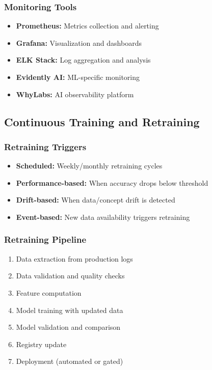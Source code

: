 \documentclass[11pt]{article}
\begin{document}
\subsubsection{Monitoring Tools}
\begin{itemize}
    \item \textbf{Prometheus:} Metrics collection and alerting
    \item \textbf{Grafana:} Visualization and dashboards
    \item \textbf{ELK Stack:} Log aggregation and analysis
    \item \textbf{Evidently AI:} ML-specific monitoring
    \item \textbf{WhyLabs:} AI observability platform
\end{itemize}

\subsection{Continuous Training and Retraining}

\subsubsection{Retraining Triggers}
\begin{itemize}
    \item \textbf{Scheduled:} Weekly/monthly retraining cycles
    \item \textbf{Performance-based:} When accuracy drops below threshold
    \item \textbf{Drift-based:} When data/concept drift is detected
    \item \textbf{Event-based:} New data availability triggers retraining
\end{itemize}

\subsubsection{Retraining Pipeline}
\begin{enumerate}
    \item Data extraction from production logs
    \item Data validation and quality checks
    \item Feature computation
    \item Model training with updated data
    \item Model validation and comparison
    \item Registry update
    \item Deployment (automated or gated)
\end{enumerate}
\end{document}

